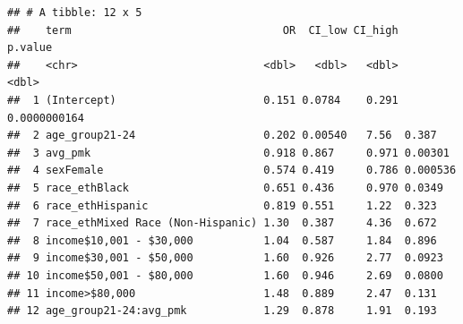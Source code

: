 \documentclass[
]{article}
\begin{document}
\begin{verbatim}
## # A tibble: 12 x 5
##    term                                 OR  CI_low CI_high      p.value
##    <chr>                             <dbl>   <dbl>   <dbl>        <dbl>
##  1 (Intercept)                       0.151 0.0784    0.291 0.0000000164
##  2 age_group21-24                    0.202 0.00540   7.56  0.387       
##  3 avg_pmk                           0.918 0.867     0.971 0.00301     
##  4 sexFemale                         0.574 0.419     0.786 0.000536    
##  5 race_ethBlack                     0.651 0.436     0.970 0.0349      
##  6 race_ethHispanic                  0.819 0.551     1.22  0.323       
##  7 race_ethMixed Race (Non-Hispanic) 1.30  0.387     4.36  0.672       
##  8 income$10,001 - $30,000           1.04  0.587     1.84  0.896       
##  9 income$30,001 - $50,000           1.60  0.926     2.77  0.0923      
## 10 income$50,001 - $80,000           1.60  0.946     2.69  0.0800      
## 11 income>$80,000                    1.48  0.889     2.47  0.131       
## 12 age_group21-24:avg_pmk            1.29  0.878     1.91  0.193
\end{verbatim}
\end{document}
